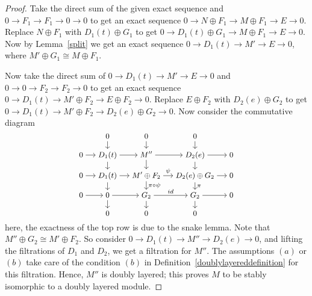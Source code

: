 \documentclass[11pt,letterpaper]{amsart}
\newcommand{\x}{\xrightarrow{}}
\theoremstyle{plain}
\theoremstyle{definition}
\theoremstyle{remark}
\begin{document}
\begin{proof}
Take the direct sum of the given exact sequence and $0\x F_1\x F_1\x0\x0$ to get an exact sequence $0\x N\oplus F_1\x M\oplus F_1\x E\x 0$. Replace $N\oplus F_1$ with $D_1(t)\oplus G_1$ to get $0\x D_1(t)\oplus G_1\x M\oplus F_1\x E\x0$. Now by Lemma~\ref{split} we get an exact sequence $0\x D_1(t)\x M'\x E\x 0$, where $M'\oplus G_1\cong M\oplus F_1$.

Now take the direct sum of $0\x D_1(t)\x M'\x E\x 0$ and $0\x 0\x F_2\x F_2\x0$ to get an exact sequence $0\x D_1(t)\x M'\oplus F_2\x E\oplus F_2\x0$. Replace $E\oplus F_2$ with $D_2(e)\oplus G_2$ to get $0\x D_1(t)\x M'\oplus F_2\x D_2(e)\oplus G_2\x0$. Now consider the commutative diagram 
\[\begin{tikzcd}[row sep=small, column sep=small,
              font=\small,cramped]
	& 0 & 0 & 0 \\
	0 & D_1(t) & {M''} & D_2(e) & 0 \\
	0 & D_1(t) & {M'\oplus F_2} & {D_2(e)\oplus G_2} & 0 \\
	0 & 0 & {G_2} & {G_2} & 0 \\
	& 0 & 0 & 0 
	\arrow[from=1-2, to=2-2]
	\arrow[from=1-3, to=2-3]
	\arrow[from=1-4, to=2-4]
	\arrow[from=2-1, to=2-2]
	\arrow[from=2-2, to=2-3]
	\arrow[from=2-2, to=3-2]
	\arrow[from=2-3, to=2-4]
	\arrow[from=2-3, to=3-3]
	\arrow[from=2-4, to=2-5]
	\arrow[from=2-4, to=3-4]
	\arrow[from=3-1, to=3-2]
	\arrow[from=3-2, to=3-3]
	\arrow[from=3-2, to=4-2]
	\arrow["\psi", from=3-3, to=3-4]
	\arrow["{\pi\circ\psi}", from=3-3, to=4-3]
	\arrow[from=3-4, to=3-5]
	\arrow["\pi", from=3-4, to=4-4]
	\arrow[from=4-1, to=4-2]
	\arrow[from=4-2, to=4-3]
	\arrow[from=4-2, to=5-2]
	\arrow["id", from=4-3, to=4-4]
	\arrow[from=4-3, to=5-3]
	\arrow[from=4-4, to=4-5]
	\arrow[from=4-4, to=5-4]
\end{tikzcd}\] here, the exactness of the top row is due to the snake lemma. Note that $M''\oplus G_2\cong M'\oplus F_2$. So consider $0\x D_1(t)\x M''\x D_2(e)\x 0$, and lifting the filtrations of $D_1$ and $D_2$, we get a filtration for $M''$. The assumptions $(a)$ or $(b)$ take care of the condition $(b)$ in  Definition~\ref{doublylayereddefinition} for this filtration. Hence, $M''$ is doubly layered; this proves $M$ to be stably isomorphic to a doubly layered module. 
\end{proof}
\end{document}
